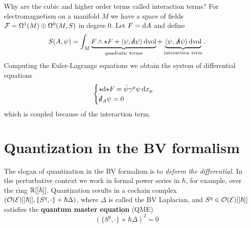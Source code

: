 \begin{example}
  Why are the cubic and higher order terms called interaction terms? For electromagnetism on a manifold $M$ we have a space of fields
  $\mathcal{F} = \Omega^1(M) \oplus \Omega^0(M, S)$ in degree $0$. Let $F = \mathrm{d} A$ and define
  \begin{equation*}
    S(A, \psi) = \int_M
    \underbrace{F \wedge {\star} F
    + \langle \psi, \slashed{\mathrm{d}} \psi \rangle \, \mathrm{d} \mathrm{vol}}_{\text{quadratic terms}}
    + \underbrace{\langle \psi, \slashed{A} \psi \rangle \, \mathrm{d} \mathrm{vol}}_{\text{interaction term}}.
  \end{equation*}
  Computing the Euler-Lagrange equations we obtain the system of differential equations
  \begin{equation*}
    \begin{cases}
      {\star} \mathrm{d} {\star} F = \bar{\psi} \gamma^\mu \psi \, \mathrm{d} x_\mu \\
      \slashed{d}_A \psi = 0
    \end{cases}
  \end{equation*}
  which is coupled because of the interaction term.
\end{example}

\section{Quantization in the BV formalism}

The slogan of quantization in the BV formalism is to \emph{deform the differential}. In the perturbative context we work in formal power series in $\hbar$, for example, over the ring $\mathbb{R}[[\hbar]]$. Quantization results in a cochain complex
$(\mathcal{O}(\mathcal{E})[[\hbar]], \{S^q, \cdot\} + \hbar \Delta)$, where $\Delta$ is called the BV Laplacian, and 
$S^q \in \mathcal{O}(\mathcal{E})[[\hbar]]$ satisfies the \textbf{quantum master equation} (QME)
\begin{equation}
  \label{eq:qme}
  (\{S^q, \cdot \} + \hbar \Delta)^2 = 0
\end{equation}

